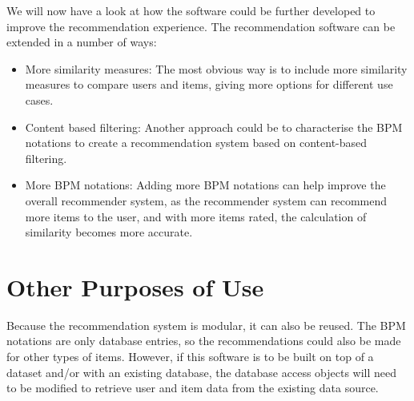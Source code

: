 \label{sec:future_work}

We will now have a look at how the software could be further developed to improve the recommendation experience.
The recommendation software can be extended in a number of ways:

\begin{itemize}
     \item More similarity measures: The most obvious way is to include more similarity measures to compare users and items, giving more options for different use cases.
     \item Content based filtering: Another approach could be to characterise the BPM notations to create a recommendation system based on content-based filtering. 
     \item More BPM notations: Adding more BPM notations can help improve the overall recommender system, as the recommender system can recommend more items to the user, and with more items rated, the calculation of similarity becomes more accurate.
\end{itemize}

\section{Other Purposes of Use}

\label{sec:repurpose}

Because the recommendation system is modular, it can also be reused. The BPM notations are only database entries, so the recommendations could also be made for other types of items. However, if this software is to be built on top of a dataset and/or with an existing database, the database access objects will need to be modified to retrieve user and item data from the existing data source.